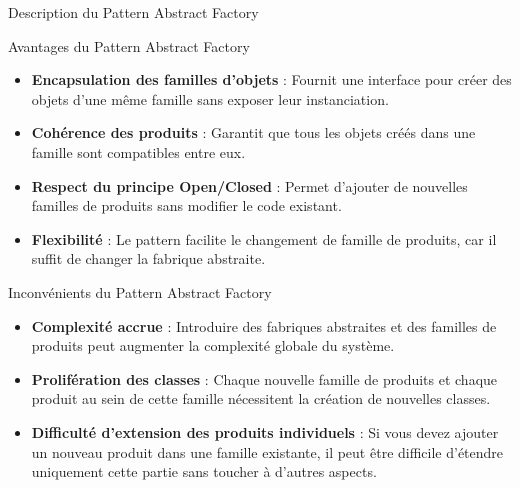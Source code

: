 \documentclass[aspectratio=169]{beamer}
\begin{document}
  \begin{frame}{Description du Pattern Abstract Factory}
  \end{frame}

  \begin{frame}{Avantages du Pattern Abstract Factory}
    \begin{itemize}
        \item \textbf{Encapsulation des familles d'objets} : Fournit une interface pour créer des objets d'une même famille sans exposer leur instanciation.
        \item \textbf{Cohérence des produits} : Garantit que tous les objets créés dans une famille sont compatibles entre eux.
        \item \textbf{Respect du principe Open/Closed} : Permet d'ajouter de nouvelles familles de produits sans modifier le code existant.
        \item \textbf{Flexibilité} : Le pattern facilite le changement de famille de produits, car il suffit de changer la fabrique abstraite.
    \end{itemize}
  \end{frame}

  \begin{frame}{Inconvénients du Pattern Abstract Factory}
    \begin{itemize}
        \item \textbf{Complexité accrue} : Introduire des fabriques abstraites et des familles de produits peut augmenter la complexité globale du système.
        \item \textbf{Prolifération des classes} : Chaque nouvelle famille de produits et chaque produit au sein de cette famille nécessitent la création de nouvelles classes.
        \item \textbf{Difficulté d'extension des produits individuels} : Si vous devez ajouter un nouveau produit dans une famille existante, il peut être difficile d'étendre uniquement cette partie sans toucher à d'autres aspects.
    \end{itemize}
  \end{frame}
\end{document}
